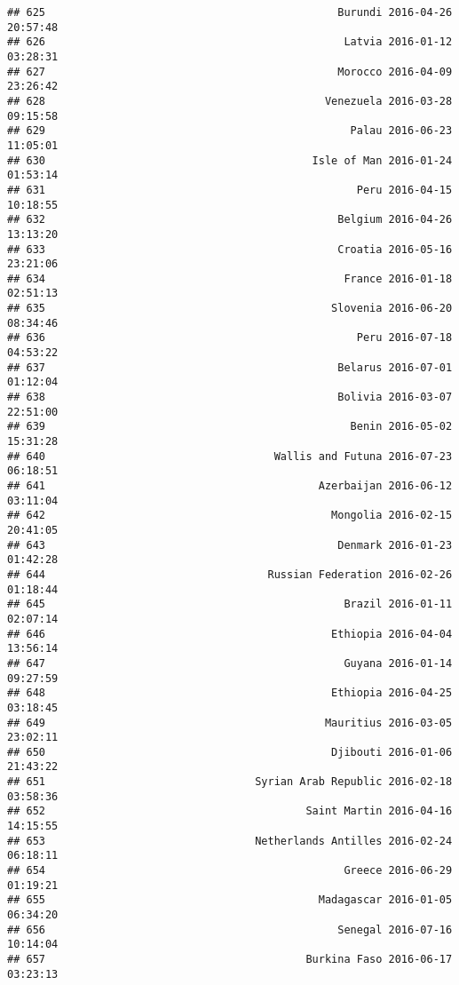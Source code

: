 \documentclass[
]{article}
\begin{document}
\begin{verbatim}
## 625                                              Burundi 2016-04-26 20:57:48
## 626                                               Latvia 2016-01-12 03:28:31
## 627                                              Morocco 2016-04-09 23:26:42
## 628                                            Venezuela 2016-03-28 09:15:58
## 629                                                Palau 2016-06-23 11:05:01
## 630                                          Isle of Man 2016-01-24 01:53:14
## 631                                                 Peru 2016-04-15 10:18:55
## 632                                              Belgium 2016-04-26 13:13:20
## 633                                              Croatia 2016-05-16 23:21:06
## 634                                               France 2016-01-18 02:51:13
## 635                                             Slovenia 2016-06-20 08:34:46
## 636                                                 Peru 2016-07-18 04:53:22
## 637                                              Belarus 2016-07-01 01:12:04
## 638                                              Bolivia 2016-03-07 22:51:00
## 639                                                Benin 2016-05-02 15:31:28
## 640                                    Wallis and Futuna 2016-07-23 06:18:51
## 641                                           Azerbaijan 2016-06-12 03:11:04
## 642                                             Mongolia 2016-02-15 20:41:05
## 643                                              Denmark 2016-01-23 01:42:28
## 644                                   Russian Federation 2016-02-26 01:18:44
## 645                                               Brazil 2016-01-11 02:07:14
## 646                                             Ethiopia 2016-04-04 13:56:14
## 647                                               Guyana 2016-01-14 09:27:59
## 648                                             Ethiopia 2016-04-25 03:18:45
## 649                                            Mauritius 2016-03-05 23:02:11
## 650                                             Djibouti 2016-01-06 21:43:22
## 651                                 Syrian Arab Republic 2016-02-18 03:58:36
## 652                                         Saint Martin 2016-04-16 14:15:55
## 653                                 Netherlands Antilles 2016-02-24 06:18:11
## 654                                               Greece 2016-06-29 01:19:21
## 655                                           Madagascar 2016-01-05 06:34:20
## 656                                              Senegal 2016-07-16 10:14:04
## 657                                         Burkina Faso 2016-06-17 03:23:13

\end{verbatim}
\end{document}
